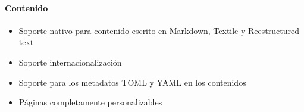 \paragraph{Contenido}

\begin{itemize}
\item Soporte nativo para contenido escrito en Markdown, Textile y Reestructured text
\item Soporte internacionalización
\item Soporte para los metadatos TOML y YAML en los contenidos
\item Páginas completamente personalizables
\end{itemize}
